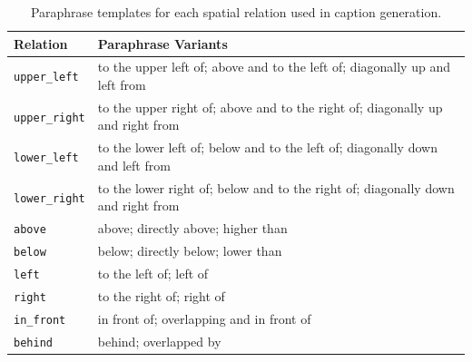 \begin{table}[!hb]
\centering
\small
\begin{tabular}{lp{}}
\toprule
\textbf{Relation} & \textbf{Paraphrase Variants} \\
\midrule
\texttt{upper\_left}
& to the upper left of; above and to the left of; diagonally up and left from \\
\texttt{upper\_right}
& to the upper right of; above and to the right of; diagonally up and right from \\
\texttt{lower\_left}
& to the lower left of; below and to the left of; diagonally down and left from \\
\texttt{lower\_right}
& to the lower right of; below and to the right of; diagonally down and right from \\
\texttt{above}
& above; directly above; higher than \\
\texttt{below}
& below; directly below; lower than \\
\texttt{left}
& to the left of; left of \\
\texttt{right}
& to the right of; right of \\
\texttt{in\_front}
& in front of; overlapping and in front of \\
\texttt{behind}
& behind; overlapped by \\
\bottomrule
\end{tabular}
\caption{Paraphrase templates for each spatial relation used in caption generation.}
\label{tab:spatial_paraphrases}
\end{table}
\newpage
